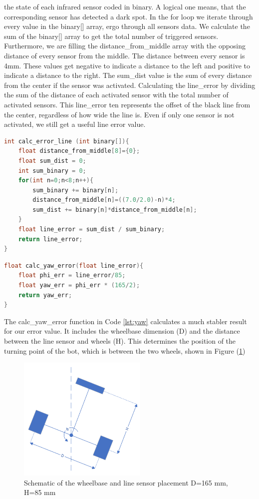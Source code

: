 \documentclass[english]{article}
\begin{document}
the state of each infrared sensor coded in binary. A logical one means, that
the corresponding sensor has detected a dark spot. In the for loop we iterate
through every value in the binary[] array, ergo through all sensors data. We 
calculate the sum of the binary[] array to get the total number of triggered 
sensors. Furthermore, we are filling the distance\_from\_middle array with the 
 opposing distance of every sensor from the middle. The distance between every
 sensor is 4mm. These values get negative to indicate a distance to the left and 
positive to indicate a distance to the right. The sum\_dist value is the sum of
every distance from the center if the sensor was activated. Calculating the 
line\_error by dividing the sum of the distance of each activated sensor with
 the total number of activated sensors. This line\_error ten represents the 
 offset of the black line from the center, regardless of how wide the line is.
  Even if only one sensor is not activated, we still get a useful line error value. 
\begin{lstlisting}[language=C, caption={Function to calculate the line error based on a binary array }, label={lst:calcer} ]
int calc_error_line (int binary[]){
    float distance_from_middle[8]={0};
    float sum_dist = 0;
    int sum_binary = 0;
    for(int n=0;n<8;n++){
        sum_binary += binary[n];
        distance_from_middle[n]=((7.0/2.0)-n)*4;
        sum_dist += binary[n]*distance_from_middle[n];
    }
    float line_error = sum_dist / sum_binary;
    return line_error;
}
\end{lstlisting}
\newpage
\begin{lstlisting}[language=C, caption={Conversion from line error to yaw error }, label={lst:yaw} ]
float calc_yaw_error(float line_error){
    float phi_err = line_error/85;
    float yaw_err = phi_err * (165/2);
    return yaw_err;
}
\end{lstlisting}
The calc\_yaw\_error function in Code \ref{lst:yaw} calculates a much stabler result
 for our error value. It includes the wheelbase dimension (D) and the 
 distance between the line sensor and wheels (H). This determines the 
 position of the turning point of the bot, which is between the two wheels, 
 shown in Figure (\ref{fig:turt}) 
 \begin{figure}[!h]
    \centering
    \includegraphics[width=0.55\textwidth, height=0.35\textheight]{figures/tut.png}
    \caption{Schematic of the wheelbase and line sensor placement\newline 
    D=165 mm, H=85 mm}
    \label{fig:turt}
\end{figure}
\end{document}
